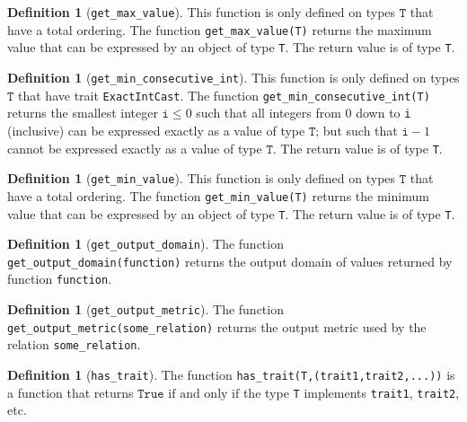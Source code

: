 \documentclass[11pt,a4paper]{article}
\theoremstyle{definition}
\newtheorem{definition}[theorem]{Definition}
\newcommand{\True}{\texttt{True}}
\newcommand{\T}{\texttt{T}}
\newcommand{\iffText}{\text{if and only if}}
\begin{document}
\begin{definition}[\texttt{get\_max\_value}]
    This function is only defined on types $\T$ that have a total ordering. The function \texttt{get\_max\_value(T)} returns the maximum value that can be expressed by an object of type \texttt{T}. The return value is of type \texttt{T}.
\end{definition}

\begin{definition}[\texttt{get\_min\_consecutive\_int}]
    This function is only defined on types $\T$ that have trait \texttt{ExactIntCast}. The function \texttt{get\_min\_consecutive\_int(T)} returns the smallest integer $\texttt{i}\leq 0$ such that all integers from 0 down to \texttt{i} (inclusive) can be expressed exactly as a value of type $\T$; but such that $\texttt{i}-1$ cannot be expressed exactly as a value of type $\T$. The return value is of type \texttt{T}.
\end{definition}

\begin{definition}[\texttt{get\_min\_value}]
    This function is only defined on types $\T$ that have a total ordering. The function \texttt{get\_min\_value(T)} returns the minimum value that can be expressed by an object of type \texttt{T}. The return value is of type \texttt{T}.
\end{definition}

\begin{definition}[\texttt{get\_output\_domain}]
    The function \texttt{get\_output\_domain(function)} returns the output domain of values returned by function \texttt{function}.
\end{definition}

\begin{definition}[\texttt{get\_output\_metric}]
    The function \texttt{get\_output\_metric(some\_relation)} returns the output metric used by the relation \texttt{some\_relation}.
\end{definition}

\begin{definition}[\texttt{has\_trait}]
    The function \texttt{has\_trait(T,(trait1,trait2,...))} is a function that returns $\True$ $\iffText$ the type \texttt{T} implements \texttt{trait1}, \texttt{trait2}, etc.
\end{definition}
\end{document}
